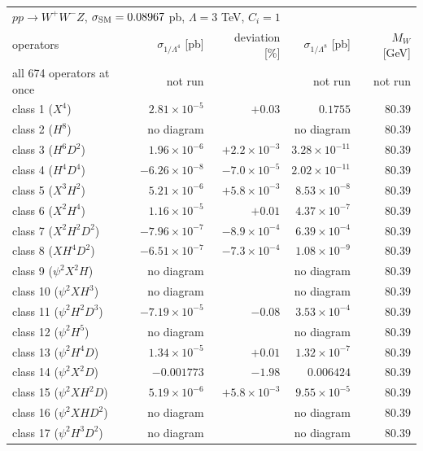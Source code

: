 \begin{table}[t]\centering\footnotesize\setlength{\tabcolsep}{4pt}
\begin{tabular}{@{}lrrrr@{}}\hline
\multicolumn{5}{l}{$p p \to W^+ W^- Z$, $\sigma_{\rm SM} = 0.08967$ pb, $\Lambda = 3$ TeV, $C_i = 1$}\\
operators & $\sigma_{1/\Lambda^4}$ [pb] & deviation [\%] & $\sigma_{1/\Lambda^8}$ [pb] & $M_W$ [GeV]\\\hline
all 674 operators at once & not run &  & not run & not run\\
class 1 ($X^4$) & $2.81\times 10^{-5}$ & $+0.03$ & $0.1755$ & $80.39$\\
class 2 ($H^8$) & no diagram &  & no diagram & $80.39$\\
class 3 ($H^6 D^2$) & $1.96\times 10^{-6}$ & $+2.2\times 10^{-3}$ & $3.28\times 10^{-11}$ & $80.39$\\
class 4 ($H^4 D^4$) & $-6.26\times 10^{-8}$ & $-7.0\times 10^{-5}$ & $2.02\times 10^{-11}$ & $80.39$\\
class 5 ($X^3 H^2$) & $5.21\times 10^{-6}$ & $+5.8\times 10^{-3}$ & $8.53\times 10^{-8}$ & $80.39$\\
class 6 ($X^2 H^4$) & $1.16\times 10^{-5}$ & $+0.01$ & $4.37\times 10^{-7}$ & $80.39$\\
class 7 ($X^2 H^2 D^2$) & $-7.96\times 10^{-7}$ & $-8.9\times 10^{-4}$ & $6.39\times 10^{-4}$ & $80.39$\\
class 8 ($X H^4 D^2$) & $-6.51\times 10^{-7}$ & $-7.3\times 10^{-4}$ & $1.08\times 10^{-9}$ & $80.39$\\
class 9 ($\psi^2 X^2 H$) & no diagram &  & no diagram & $80.39$\\
class 10 ($\psi^2 X H^3$) & no diagram &  & no diagram & $80.39$\\
class 11 ($\psi^2 H^2 D^3$) & $-7.19\times 10^{-5}$ & $-0.08$ & $3.53\times 10^{-4}$ & $80.39$\\
class 12 ($\psi^2 H^5$) & no diagram &  & no diagram & $80.39$\\
class 13 ($\psi^2 H^4 D$) & $1.34\times 10^{-5}$ & $+0.01$ & $1.32\times 10^{-7}$ & $80.39$\\
class 14 ($\psi^2 X^2 D$) & $-0.001773$ & $-1.98$ & $0.006424$ & $80.39$\\
class 15 ($\psi^2 X H^2 D$) & $5.19\times 10^{-6}$ & $+5.8\times 10^{-3}$ & $9.55\times 10^{-5}$ & $80.39$\\
class 16 ($\psi^2 X H D^2$) & no diagram &  & no diagram & $80.39$\\
class 17 ($\psi^2 H^3 D^2$) & no diagram &  & no diagram & $80.39$\\

\end{tabular}
\end{table}
